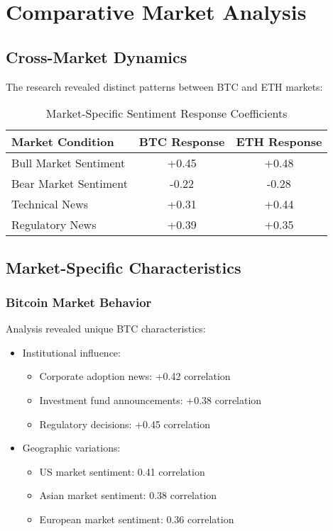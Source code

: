 \documentclass[12pt,a4paper]{report}
\begin{document}
\chapter{Comparative Market Analysis}
\section{Cross-Market Dynamics}
The research revealed distinct patterns between BTC and ETH markets:

\begin{table}[h]
    \centering
    \begin{tabular}{lcc}
        \toprule
        Market Condition & BTC Response & ETH Response \\
        \midrule
        Bull Market Sentiment & +0.45 & +0.48 \\
        Bear Market Sentiment & -0.22 & -0.28 \\
        Technical News & +0.31 & +0.44 \\
        Regulatory News & +0.39 & +0.35 \\
        \bottomrule
    \end{tabular}
    \caption{Market-Specific Sentiment Response Coefficients}
\end{table}

\section{Market-Specific Characteristics}
\subsection{Bitcoin Market Behavior}
Analysis revealed unique BTC characteristics:
\begin{itemize}
    \item Institutional influence:
        \begin{itemize}
            \item Corporate adoption news: +0.42 correlation
            \item Investment fund announcements: +0.38 correlation
            \item Regulatory decisions: +0.45 correlation
        \end{itemize}
    \item Geographic variations:
        \begin{itemize}
            \item US market sentiment: 0.41 correlation
            \item Asian market sentiment: 0.38 correlation
            \item European market sentiment: 0.36 correlation
        \end{itemize}
\end{itemize}
\end{document}
